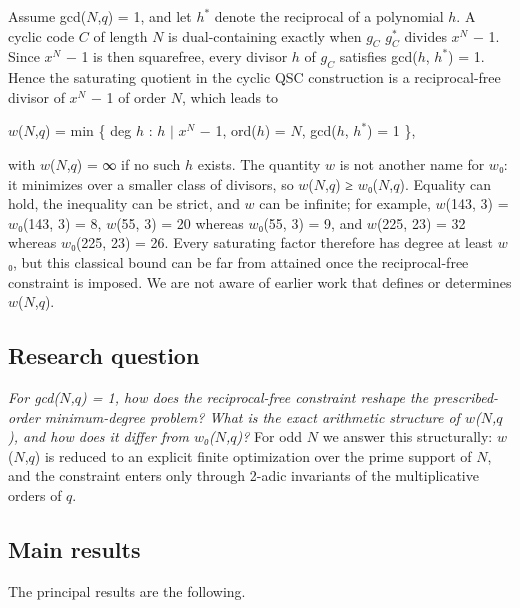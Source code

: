 \documentclass[pdflatex,sn-mathphys-num]{sn-jnl}
\theoremstyle{thmstyleone}
\theoremstyle{thmstylethree}
\begin{document}
Assume gcd(\(N\),\(q\)) = 1, and let \(h^{*}\) denote the reciprocal of a polynomial \(h\). A cyclic code \(C\) of length \(N\) is dual-containing exactly when \(g_C\) \(g_C^{*}\) divides \(x^N\) − 1. Since \(x^N\) − 1 is then squarefree, every divisor \(h\) of \(g_C\) satisfies gcd(\(h\), \(h^{*}\)) = 1. Hence the saturating quotient in the cyclic QSC construction is a reciprocal-free divisor of \(x^N\) − 1 of order \(N\), which leads to

\begin{center}\(w\)(\(N\),\(q\)) = min \{ deg \(h\) : \(h\) \(\mid\) \(x^N\) − 1, ord(\(h\)) = \(N\), gcd(\(h\), \(h^{*}\)) = 1 \},\end{center}

with \(w\)(\(N\),\(q\)) = ∞ if no such \(h\) exists. The quantity \(w\) is not another name for \(w\)₀: it minimizes over a smaller class of divisors, so \(w\)(\(N\),\(q\)) ≥ \(w\)₀(\(N\),\(q\)). Equality can hold, the inequality can be strict, and \(w\) can be infinite; for example, \(w\)(143, 3) = \(w\)₀(143, 3) = 8, \(w\)(55, 3) = 20 whereas \(w\)₀(55, 3) = 9, and \(w\)(225, 23) = 32 whereas \(w\)₀(225, 23) = 26. Every saturating factor therefore has degree at least \(w\)₀, but this classical bound can be far from attained once the reciprocal-free constraint is imposed. We are not aware of earlier work that defines or determines \(w\)(\(N\),\(q\)).

\subsection{Research question}

\emph{For gcd(\(N\),\(q\)) = 1, how does the reciprocal-free constraint reshape the prescribed-order minimum-degree problem? What is the exact arithmetic structure of \(w\)(\(N\),\(q\)), and how does it differ from \(w\)₀(\(N\),\(q\))?} For odd \(N\) we answer this structurally: \(w\)(\(N\),\(q\)) is reduced to an explicit finite optimization over the prime support of \(N\), and the constraint enters only through 2-adic invariants of the multiplicative orders of \(q\).

\subsection{Main results}

The principal results are the following.
\end{document}
